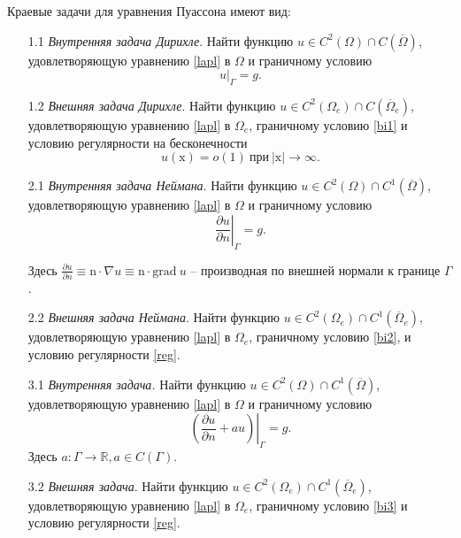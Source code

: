     Краевые задачи для уравнения Пуассона имеют вид:
    \begin{enumerate}
        \item[1.1] \textit{Внутренняя задача Дирихле}. Найти функцию \(u \in C^2 (\Omega)  \cap C ( \overline{\Omega} )  \), удовлетворяющую уравнению \eqref{lapl} в \( \Omega \) и граничному условию 
        \begin{equation}
            u|_\Gamma = g. \label{bi1}
        \end{equation}

        
        \item[1.2] \textit{Внешняя задача Дирихле}. Найти функцию \(u \in C^2 (\Omega_e) \cap C ( \overline{\Omega}_e ) \), удовлетворяющую уравнению \eqref{lapl} в \( \Omega_e \), граничному условию \eqref{bi1} и условию регулярности на бесконечности
        \begin{equation}
            u( \mathrm{x} ) = o(1) ~ \text{при} ~ |\mathrm{x}| \to \infty. \label{reg}
        \end{equation}

        \item[2.1] \textit{Внутренняя задача Неймана}. Найти функцию \(u \in C^2 (\Omega) \cap C^1 ( \overline{\Omega} ) \), удовлетворяющую уравнению \eqref{lapl} в \( \Omega \) и граничному условию 
        \begin{equation}
            \left. \frac{\partial u}{\partial n} \right|_\Gamma = g. \label{bi2}
        \end{equation}

        \begin{remark}
            Здесь $\frac{\partial u}{\partial n} \equiv \mathrm{n} \cdot \nabla u \equiv \mathrm{n} \cdot \mathrm{grad} ~ u $ -- производная по внешней нормали к границе $\Gamma$.
        \end{remark}

        \item[2.2] \textit{Внешняя задача Неймана}. Найти функцию \(u \in C^2 (\Omega_e) \cap C^1 ( \overline{\Omega}_e ) \), удовлетворяющую уравнению \eqref{lapl} в \( \Omega_e \), граничному условию \eqref{bi2}, и условию регулярности \eqref{reg}.

        \item[3.1] \textit{Внутренняя задача.} Найти функцию \(u \in C^2 \left(\Omega\right) \cap C^1 ( \overline{\Omega} ) \), удовлетворяющую уравнению \eqref{lapl} в \( \Omega \) и граничному условию 
        \begin{equation}
            \left.\left( \frac{\partial u}{\partial n} + au \right) \right|_\Gamma = g. \label{bi3}
        \end{equation}
        Здесь \( a: \Gamma \rightarrow \mathbb{R}, a \in C(\Gamma) \).
    
        \item[3.2] \textit{Внешняя задача}. Найти функцию \(u \in C^2 \left(\Omega_e\right) \cap C^1 ( \overline{\Omega}_e ) \), удовлетворяющую уравнению \eqref{lapl} в \( \Omega_e \), граничному условию \eqref{bi3} и условию регулярности \eqref{reg}.
        
    \end{enumerate}

